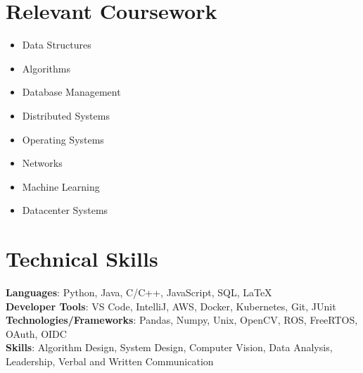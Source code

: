 \documentclass[letterpaper,11pt]{article}
\newcommand{\resumeSubHeadingListStart}{\begin{itemize}[leftmargin=0.0in, label={}]}
\newcommand{\resumeSubHeadingListEnd}{\end{itemize}}
\begin{document}
\section{Relevant Coursework}
        \begin{multicols}{4}
            \begin{itemize}[itemsep=-5pt, parsep=3pt]
                \item Data Structures
                \item Algorithms
                \item Database Management
                \item Distributed Systems
                \item Operating Systems
                \item Networks
                \item Machine Learning
                \item Datacenter Systems
            \end{itemize}
        \end{multicols}
        \vspace*{2.0\multicolsep}


%
\section{Technical Skills}
 \begin{itemize}[leftmargin=0.15in, label={}]
    \small{\item{
     \textbf{Languages}{: Python, Java, C/C++, JavaScript, SQL, \LaTeX} \\
     \textbf{Developer Tools}{: VS Code, IntelliJ, AWS, Docker, Kubernetes, Git, JUnit} \\
     \textbf{Technologies/Frameworks}{: Pandas, Numpy, Unix, OpenCV, ROS, FreeRTOS, OAuth, OIDC} \\
     \textbf{Skills}{: Algorithm Design, System Design, Computer Vision, Data Analysis, Leadership, Verbal and Written Communication}\\
    }}
 \end{itemize}
 \vspace{-16pt}
\end{document}

